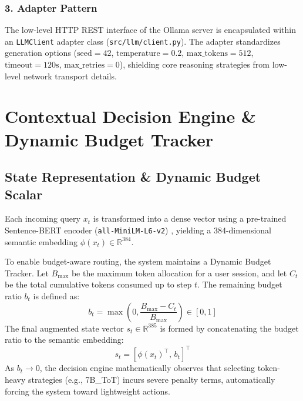 \documentclass[pdflatex,sn-mathphys-num]{sn-jnl}%
\theoremstyle{thmstyleone}%
\theoremstyle{thmstyletwo}%
\theoremstyle{thmstylethree}%
\begin{document}
\subsubsection{3. Adapter Pattern}
The low-level HTTP REST interface of the Ollama server is encapsulated within an \texttt{LLMClient} adapter class (\texttt{src/llm/client.py}). The adapter standardizes generation options ($\text{seed}=42$, $\text{temperature}=0.2$, $\text{max\_tokens}=512$, $\text{timeout}=120\text{s}$, $\text{max\_retries}=0$), shielding core reasoning strategies from low-level network transport details.

\section{Contextual Decision Engine \& Dynamic Budget Tracker}\label{sec3}

\subsection{State Representation \& Dynamic Budget Scalar}
Each incoming query $x_t$ is transformed into a dense vector using a pre-trained Sentence-BERT encoder (\texttt{all-MiniLM-L6-v2}) \cite{reimers2019sentence}, yielding a 384-dimensional semantic embedding $\phi(x_t) \in \mathbb{R}^{384}$. 

To enable budget-aware routing, the system maintains a Dynamic Budget Tracker. Let $B_{\max}$ be the maximum token allocation for a user session, and let $C_t$ be the total cumulative tokens consumed up to step $t$. The remaining budget ratio $b_t$ is defined as:
\begin{equation}
b_t = \max\left(0, \frac{B_{\max} - C_t}{B_{\max}}\right) \in [0, 1]
\end{equation}
The final augmented state vector $s_t \in \mathbb{R}^{385}$ is formed by concatenating the budget ratio to the semantic embedding:
\begin{equation}
s_t = \left[ \phi(x_t)^\top, \, b_t \right]^\top
\end{equation}
As $b_t \rightarrow 0$, the decision engine mathematically observes that selecting token-heavy strategies (e.g., 7B\_ToT) incurs severe penalty terms, automatically forcing the system toward lightweight actions.
\end{document}
